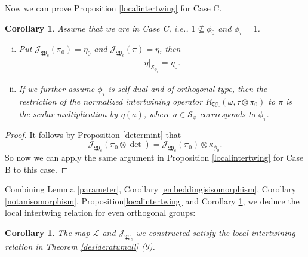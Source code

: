 \documentclass[article]{article}
\numberwithin{equation}{section}
\newtheorem{corollary}[theorem]{Corollary}
\newtheorem{proposition}[theorem]{Proposition}
\theoremstyle{definition}
\DeclareMathOperator{\Ind}{Ind}
\begin{document}
Now we can prove Proposition \ref{localintertwing} for Case C.
\begin{corollary}\label{CaseC}
	Assume that we are in Case C, i.e., $1\not\subseteq \phi_0$ and $\phi_\tau=1$. 
	\begin{enumerate}[(i)]
		\item Put $\mathcal J_{\mathfrak W_c}(\pi_0)=\eta_0$ and $\mathcal J_{\mathfrak W_c}(\pi)=\eta$, then 
		\begin{align*}
		\eta|_{\mathcal S_{\phi_0}}=\eta_0.
		\end{align*}
		\item If we further assume $\phi_{\tau}$ is self-dual and of orthogonal type, then the restriction of the normalized intertwining operator $R_{\mathfrak W_c}(\omega,\tau\otimes \pi_0)$ to $\pi$ is the scalar multiplication by $\eta(a)$, where $a\in \mathcal {S}_{\phi}$ corrresponds to $\phi_{\tau}$. 
	\end{enumerate} 
\end{corollary}
\begin{proof}
	It follows by Proposition \ref{determint} that 
	$$\mathcal J_{\mathfrak W_c}(\pi_0\otimes\det)=\mathcal J_{\mathfrak W_c}(\pi_0)\otimes \kappa_{\phi_{0}}.$$
	So now we can apply the same argument in Proposition \ref{localintertwing} for Case B to this case.
\end{proof}



Combining Lemma \ref{parameter}, Corollary \ref{embeddingisisomorphism}, Corollary \ref{notanisomorphism}, Proposition\ref{localintertwing} and Corollary \ref{CaseC}, we deduce the local intertwing relation  for even orthogonal groups: 
\begin{corollary}\label{LIRfinal}
	The map $\mathcal L$ and $\mathcal J_{\mathfrak W_c}$ we constructed satisfy the local intertwining relation in Theorem \ref{desideratumall} (9).  
\end{corollary}
\begin{comment}
\begin{proposition}\label{induceddecomposition}
There is a decomposition of the induced representation 
$$
\Ind_{P}^{\mathrm O(V)}(\tau\otimes \pi_0)=\bigoplus_{\eta}\pi_{c^{\prime}}(\phi,\eta)
$$
where the sum runs for all $\eta\in \widehat{\mathcal {S}_{\phi}^{+}}$ such that $\eta|_{S_{\phi_{0}}^{+}}=\eta_0$
\end{proposition}
This Lemma together with Lemma \ref{localintertwing} gives us the local intertwing relation for Even orthogonal groups, which is  Desideratum \ref{desideratumorthgonal}(7). 
\end{comment}
\end{document}
